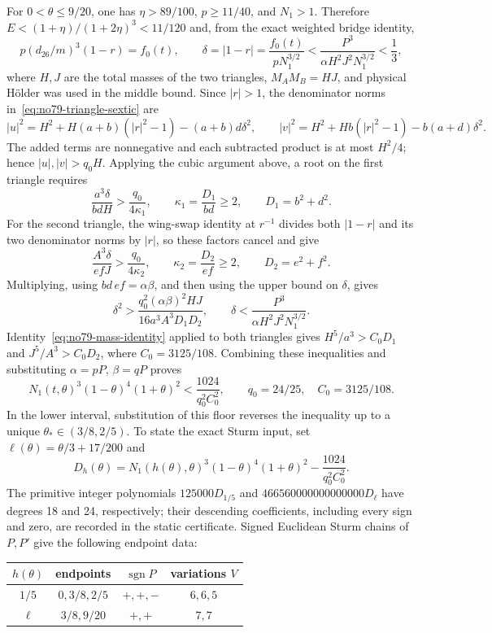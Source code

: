 \documentclass[11pt]{amsart}
\theoremstyle{remark}
\begin{document}
For $0<\theta\le9/20$, one has $\eta>89/100$, $p\ge11/40$, and $N_1>1$. Therefore $E<(1+\eta)/(1+2\eta)^3<11/120$ and, from the exact weighted bridge identity,
\[
p(d_{26}/m)^3(1-r)=f_0(t),\qquad
\delta=|1-r|=\frac{f_0(t)}{pN_1^{3/2}}
<\frac{P^3}{\alpha H^2J^2N_1^{3/2}}<\frac13,
\]
where $H,J$ are the total masses of the two triangles, $M_AM_B=HJ$, and physical H\"older was used in the middle bound. Since $|r|>1$, the denominator norms in~\eqref{eq:no79-triangle-sextic} are
\[
|u|^2=H^2+H(a+b)(|r|^2-1)-(a+b)d\delta^2,\qquad
|v|^2=H^2+Hb(|r|^2-1)-b(a+d)\delta^2.
\]
The added terms are nonnegative and each subtracted product is at most $H^2/4$; hence $|u|,|v|>q_0H$. Applying the cubic argument above, a root on the first triangle requires
\[
\frac{a^3\delta}{bdH}>\frac{q_0}{4\kappa_1},\qquad \kappa_1=\frac{D_1}{bd}\ge2,\qquad D_1=b^2+d^2.
\]
For the second triangle, the wing-swap identity at $r^{-1}$ divides both $|1-r|$ and its two denominator norms by $|r|$, so these factors cancel and give
\[
\frac{A^3\delta}{efJ}>\frac{q_0}{4\kappa_2},\qquad \kappa_2=\frac{D_2}{ef}\ge2,\qquad D_2=e^2+f^2.
\]
Multiplying, using $bd\,ef=\alpha\beta$, and then using the upper bound on $\delta$, gives
\[
\delta^2>\frac{q_0^2(\alpha\beta)^2HJ}{16a^3A^3D_1D_2},\qquad
\delta<\frac{P^3}{\alpha H^2J^2N_1^{3/2}}.
\]
Identity~\eqref{eq:no79-mass-identity} applied to both triangles gives $H^5/a^3>C_0D_1$ and $J^5/A^3>C_0D_2$, where $C_0=3125/108$. Combining these inequalities and substituting $\alpha=pP$, $\beta=qP$ proves
\begin{equation}\label{eq:no79-asymmetry-bound}
N_1(t,\theta)^3(1-\theta)^4(1+\theta)^2<\frac{1024}{q_0^2C_0^2},\qquad q_0=24/25,\quad C_0=3125/108.
\end{equation}
In the lower interval, substitution of this floor reverses the inequality up to a unique $\theta_*\in(3/8,2/5)$. To state the exact Sturm input, set $\ell(\theta)=\theta/3+17/200$ and
\[
D_h(\theta)=N_1(h(\theta),\theta)^3(1-\theta)^4(1+\theta)^2-\frac{1024}{q_0^2C_0^2}.
\]
The primitive integer polynomials $125000D_{1/5}$ and $466560000000000000D_\ell$ have degrees 18 and 24, respectively; their descending coefficients, including every sign and zero, are recorded in the static certificate. Signed Euclidean Sturm chains of $P,P'$ give the following endpoint data:
\begin{center}\small
\begin{tabular}{c c c c}
$h(\theta)$ & endpoints & $\operatorname{sgn}P$ & variations $V$ \\
\hline
$1/5$ & $0,3/8,2/5$ & $+,+,-$ & $6,6,5$ \\
$\ell$ & $3/8,9/20$ & $+,+$ & $7,7$ \\
\end{tabular}
\end{center}
\end{document}
